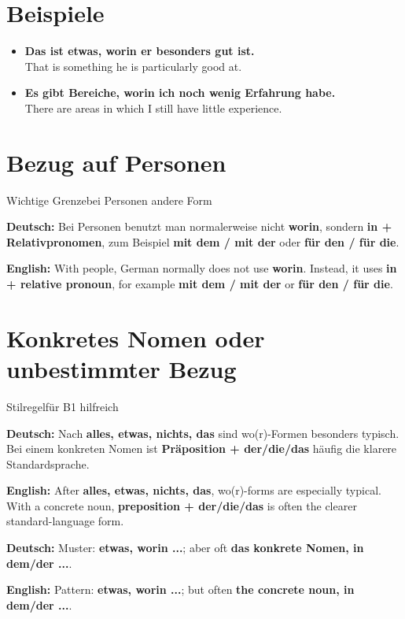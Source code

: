 \documentclass[a4paper,11pt]{article}
\newcommand{\GermanText}[1]{\textbf{Deutsch: }#1\par}
\newcommand{\EnglishText}[1]{{\small\color{SoftGray}\textbf{English: }#1\par}}
\newcommand{\ExampleItem}[2]{\item \textbf{#1}\\{\small\color{SoftGray}#2}}
\begin{document}
\section{Beispiele}

\begin{exbox}

\begin{itemize}

\ExampleItem{Das ist etwas, worin er besonders gut ist.}{That is something he is particularly good at.}

\ExampleItem{Es gibt Bereiche, worin ich noch wenig Erfahrung habe.}{There are areas in which I still have little experience.}

\end{itemize}

\end{exbox}

\section{Bezug auf Personen}

\begin{grammarentry}{Wichtige Grenze}{bei Personen andere Form}

\GermanText{Bei Personen benutzt man normalerweise nicht \textbf{worin}, sondern \textbf{in + Relativpronomen}, zum Beispiel \textbf{mit dem / mit der} oder \textbf{für den / für die}.}

\EnglishText{With people, German normally does not use \textbf{worin}. Instead, it uses \textbf{in + relative pronoun}, for example \textbf{mit dem / mit der} or \textbf{für den / für die}.}

\end{grammarentry}

\section{Konkretes Nomen oder unbestimmter Bezug}

\begin{grammarentry}{Stilregel}{für B1 hilfreich}

\GermanText{Nach \textbf{alles, etwas, nichts, das} sind wo(r)-Formen besonders typisch. Bei einem konkreten Nomen ist \textbf{Präposition + der/die/das} häufig die klarere Standardsprache.}

\EnglishText{After \textbf{alles, etwas, nichts, das}, wo(r)-forms are especially typical. With a concrete noun, \textbf{preposition + der/die/das} is often the clearer standard-language form.}

\GermanText{Muster: \textbf{etwas, worin ...}; aber oft \textbf{das konkrete Nomen, in dem/der ...}.}

\EnglishText{Pattern: \textbf{etwas, worin ...}; but often \textbf{the concrete noun, in dem/der ...}.}

\end{grammarentry}
\end{document}
